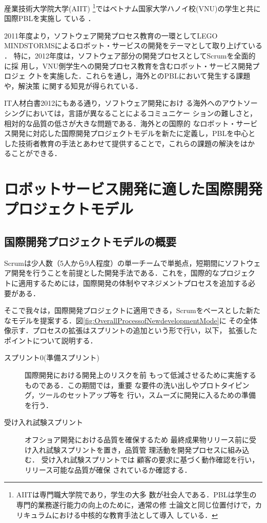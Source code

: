 \documentclass[a4j, 12Q, twocolumn, twoside]{jsarticle}
\begin{document}
産業技術大学院大学(AIIT) \footnote{AIITは専門職大学院であり，学生の大多
数が社会人である．PBLは学生の専門的業務遂行能力の向上のために，通常の修
士論文と同じ位置付けで，カリキュラムにおける中核的な教育手法として導入
している．}ではベトナム国家大学ハノイ校(VNU)の学生と共に国際PBLを実施し
ている
\cite{pub:tozawa-global-2009,大類優子2009n,nishino2010,木崎2011チケット駆動}
．


%
2011年度より，ソフトウェア開発プロセス教育の一環としてLEGO
MINDSTORMSによるロボット・サービスの開発をテーマとして取り上げている
\cite{木崎悟2012国際}
．
%
特に，2012年度は，ソフトウェア部分の開発プロセスとしてScrumを全面的に採
用し，VNU側学生への開発プロセス教育を含むロボット・サービス開発プロジェ
クトを実施した．これらを通し，海外とのPBLにおいて発生する課題や，解決策
に関する知見が得られている．

IT人材白書2012\cite{IT人材白書2012}にもある通り，ソフトウェア開発におけ
る海外へのアウトソーシングにおいては，言語が異なることによるコミュニケー
ションの難しさと，相対的な品質の低さが大きな問題である．海外との国際的
なロボット・サービス開発に対応した国際開発プロジェクトモデルを新たに定義し，PBLを中心と
した技術者教育の手法とあわせて提供することで，これらの課題の解決をはか
ることができる．



\section{ロボットサービス開発に適した国際開発プロジェクトモデル}\label{sec:model}
\subsection{国際開発プロジェクトモデルの概要}

Scrumは少人数（5人から9人程度）の単一チームで単拠点，短期間にソフトウェ
ア開発を行うことを前提とした開発手法である．これを，国際的なプロジェク
トに適用するためには，国際開発の体制やマネジメントプロセスを追加する必
要がある．

そこで我々は，国際開発プロジェクトに適用できる，Scrumをベースとした新た
なモデルを提案する．図\ref{fig:OverallProcessofNewdevelopmentMode}に
その全体像示す．プロセスの拡張はスプリントの追加という形で行い，以下，
拡張したポイントについて説明する．

\begin{description}
 \item[スプリント0(準備スプリント)] 国際開発における開発上のリスクを前
	    もって低減させるために実施するものである．この期間では，重要
	    な要件の洗い出しやプロトタイピング，ツールのセットアップ等を
	    行い，スムーズに開発に入るための準備を行う．
 \item[受け入れ試験スプリント] オフショア開発における品質を確保するため
	    最終成果物リリース前に受け入れ試験スプリントを置き，品質管
	    理活動を開発プロセスに組み込む． 受け入れ試験スプリントでは
	    顧客の要求に基づく動作確認を行い，リリース可能な品質が確保
	    されているか確認する．
\end{description}
\end{document}
